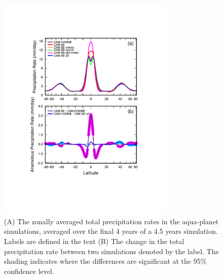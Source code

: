\documentclass{agujournal}
\begin{document}
{\begin{figure}[h]
\centering
\includegraphics[width=20pc]{figs/dzonal_prect.pdf}
\caption{(A) The zonally averaged total precipitation rates in the aqua-planet simulations, averaged over the final 4 years of a 4.5 years simulation. Labels are defined in the text (B) The change in the total precipitation rate between two simulations denoted by the label. The shading indicates where the differences are significant at the 95\% confidence level.}
\label{fig:dzonal}
\end{figure}

%

}
\end{document}
